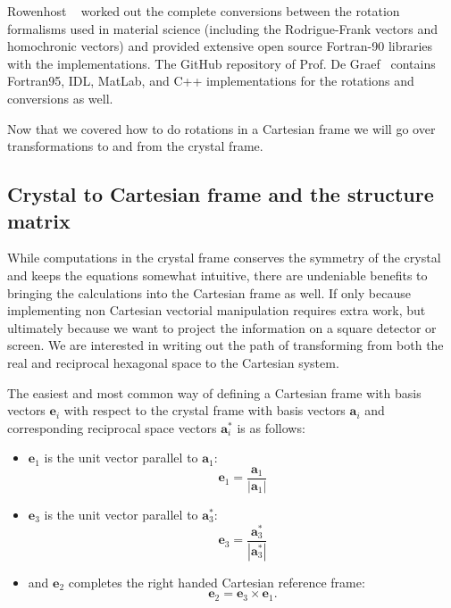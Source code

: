 Rowenhost \etal~\cite{Rowenhorst15} worked out the complete conversions between the rotation formalisms used in material science (including the Rodrigue-Frank vectors and homochronic vectors) and provided extensive open source Fortran-90 libraries with the implementations. The GitHub repository of Prof. De Graef~\cite{3Drot} contains Fortran95, IDL, MatLab, and C++ implementations for the rotations and conversions as well.


Now that we covered how to do rotations in a Cartesian frame we will go over transformations to and from the crystal frame.


\subsection{Crystal to Cartesian frame and the structure matrix}

While computations in the crystal frame conserves the symmetry of the crystal and keeps the equations somewhat intuitive, there are undeniable benefits to bringing the calculations into the Cartesian frame as well. If only because implementing non Cartesian vectorial manipulation requires extra work, but ultimately because we want to project the information on a square detector or screen. We are interested in writing out the path of transforming from both the real and reciprocal hexagonal space to the Cartesian system. 

The easiest and most common way of defining a Cartesian frame with basis vectors $\mathbf{e}_i$ with respect to the crystal frame with basis vectors $\mathbf{a}_i$ and corresponding reciprocal space vectors  $\mathbf{a}^*_i$ is as follows:
\begin{itemize}
\item  $\mathbf{e}_1$ is the unit vector parallel to $\mathbf{a}_1$:
\begin{equation}
\label{eq:e1}
\mathbf{e}_1 =\frac{\mathbf{a}_1 }{|\mathbf{a}_1| } 
\end{equation}

\item  $\mathbf{e}_3$ is the unit vector parallel to $\mathbf{a}^*_3$: 
\begin{equation}
\mathbf{e}_3 =\frac{\mathbf{a}^*_3 }{|\mathbf{a}^*_3| } 
\end{equation}

\item and $\mathbf{e}_2$ completes the right handed Cartesian reference frame:
\begin{equation}
\label{eq:e3}
\mathbf{e}_2 = \mathbf{e}_3 \times \mathbf{e}_1 .
\end{equation}
\end{itemize}

